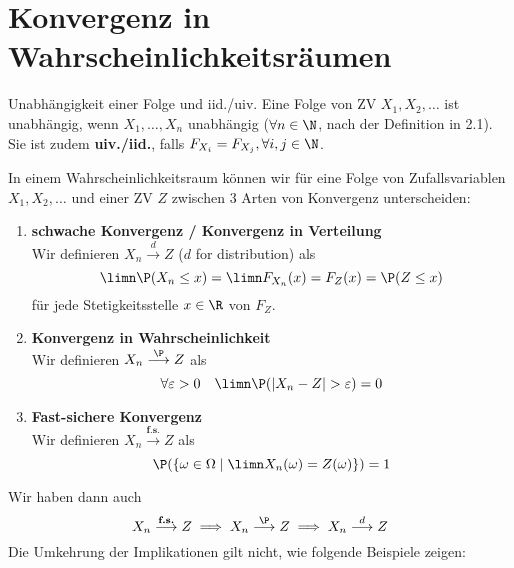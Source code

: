 \section{Konvergenz in Wahrscheinlichkeitsräumen}
\begin{subbox}{Unabhängigkeit einer Folge und iid./uiv.}
    Eine Folge von ZV $X_1, X_2, \ldots$ ist unabhängig, wenn $X_1, \ldots, X_n$ unabhängig ($\forall n \in \N$, nach der Definition in 2.1).
    Sie ist zudem \textbf{uiv./iid.}, falls $F_{X_i} = F_{X_j}, \forall i,j \in \N$.
\end{subbox}
In einem Wahrscheinlichkeitsraum können wir für eine Folge von Zufallsvariablen $X_1, X_2, \ldots$ und einer ZV $Z$ zwischen 3 Arten von Konvergenz unterscheiden:
\begin{enumerate}
    \item \textbf{schwache Konvergenz / Konvergenz in Verteilung}\\
    Wir definieren $X_n \overset{d}{\longrightarrow} Z$ ($d$ for distribution) als
    $$\limn \P(X_n \leq x) = \limn F_{X_n}(x) = F_Z(x) = \P(Z \leq x)$$
    für jede Stetigkeitsstelle $x\in \R$ von $F_Z$.
    \item \textbf{Konvergenz in Wahrscheinlichkeit}\\
    Wir definieren $X_n \overset{\P}{\longrightarrow} Z$ als
    $$\forall \varepsilon > 0 \quad \limn \P(|X_n - Z| > \varepsilon) = 0$$
    \item \textbf{Fast-sichere Konvergenz}\\
    Wir definieren $X_n \overset{\textbf{f.s.}}{\longrightarrow} Z$ als
    $$\P(\{\omega \in \Omega \mid \limn X_n(\omega) = Z(\omega)\}) = 1$$
\end{enumerate}
Wir haben dann auch $$X_n \overset{\textbf{f.s.}}{\longrightarrow} Z \implies X_n \overset{\P}{\longrightarrow} Z \implies X_n \overset{d}{\longrightarrow} Z$$
Die Umkehrung der Implikationen gilt nicht, wie folgende Beispiele zeigen:
